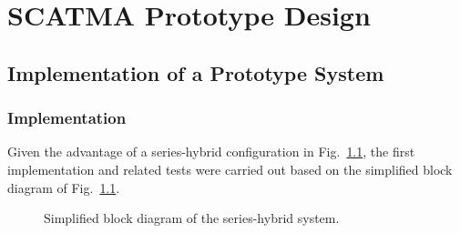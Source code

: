 \chapter{\textbf{SCATMA Prototype Design}}
\label{ch:prototype}


\section{Implementation of a Prototype System}

\subsection{Implementation}
Given the advantage of a series-hybrid configuration in Fig.~\ref{fg:series_hybrid_block}, the first implementation and related tests  were carried out based on the simplified block diagram of Fig.~\ref{fg:series_hybrid_block}. 


\begin{figure}[b]
	\centering
	\caption[Simplified block diagram of the hybrid-series system.]
	{%
		\label{fg:series_hybrid_block}
		\centering
		Simplified block diagram of the series-hybrid system.}
\end{figure}

